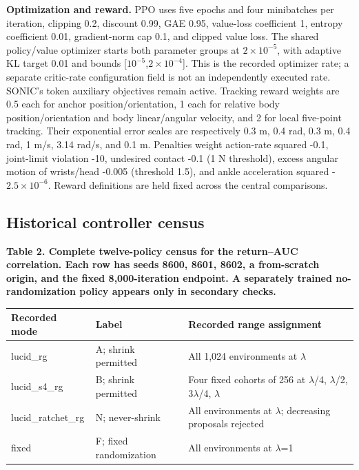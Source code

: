 \documentclass[letterpaper,10pt,conference]{ieeeconf}
\begin{document}
\textbf{Optimization and reward.} PPO uses five epochs and four minibatches per iteration, clipping 0.2, discount 0.99, GAE 0.95, value-loss coefficient 1, entropy coefficient 0.01, gradient-norm cap 0.1, and clipped value loss. The shared policy/value optimizer starts both parameter groups at $2\times10^{-5}$, with adaptive KL target 0.01 and bounds [$10^{-5}$,$2\times10^{-4}$]. This is the recorded optimizer rate; a separate critic-rate configuration field is not an independently executed rate. SONIC's token auxiliary objectives remain active. Tracking reward weights are 0.5 each for anchor position/orientation, 1 each for relative body position/orientation and body linear/angular velocity, and 2 for local five-point tracking. Their exponential error scales are respectively 0.3 m, 0.4 rad, 0.3 m, 0.4 rad, 1 m/s, 3.14 rad/s, and 0.1 m. Penalties weight action-rate squared -0.1, joint-limit violation -10, undesired contact -0.1 (1 N threshold), excess angular motion of wrists/head -0.005 (threshold 1.5), and ankle acceleration squared -$2.5\times10^{-6}$. Reward definitions are held fixed across the central comparisons.

\subsection{Historical controller census}


\begin{table}[t]\small
\textbf{Table 2. Complete twelve-policy census for the return--AUC correlation. Each row has seeds 8600, 8601, 8602, a from-scratch origin, and the fixed 8,000-iteration endpoint. A separately trained no-randomization policy appears only in secondary checks.}\par\medskip
\begin{tabularx}{\linewidth}{XXX}\hline
Recorded mode & Label & Recorded range assignment \\\hline
lucid\_rg & A; shrink permitted & All 1,024 environments at $\lambda$ \\
lucid\_s4\_rg & B; shrink permitted & Four fixed cohorts of 256 at $\lambda$/4, $\lambda$/2, 3$\lambda$/4, $\lambda$ \\
lucid\_ratchet\_rg & N; never-shrink & All environments at $\lambda$; decreasing proposals rejected \\
fixed & F; fixed randomization & All environments at $\lambda$=1 \\
\hline\end{tabularx}\end{table}
\end{document}
